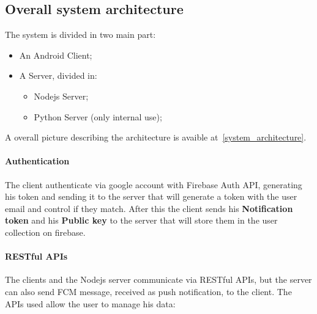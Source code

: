 \documentclass[../../main]{subfiles}
\begin{document}
\subsection{Overall system architecture}
The system is divided in two main part:
    \begin{itemize}
        \item An Android Client;
        \item A Server, divided in:
        \begin{itemize}
            \item Nodejs Server;
            \item Python Server (only internal use);
        \end{itemize}
    \end{itemize}
A overall picture describing the architecture is avaible at\ \ref{system_architecture}.

\paragraph*{Authentication}
The client authenticate via google account with Firebase Auth API, generating his token and sending it to the server 
that will generate a token with the user email and control if they match. After this the client sends 
his \textbf{Notification token} and his \textbf{Public key} to the server that will store them in the user collection on firebase.

\paragraph*{RESTful APIs}
The clients and the Nodejs server communicate via RESTful APIs, but the server can also send FCM message, received as push notification, to the client.
The APIs used allow the user to manage his data:
\end{document}
